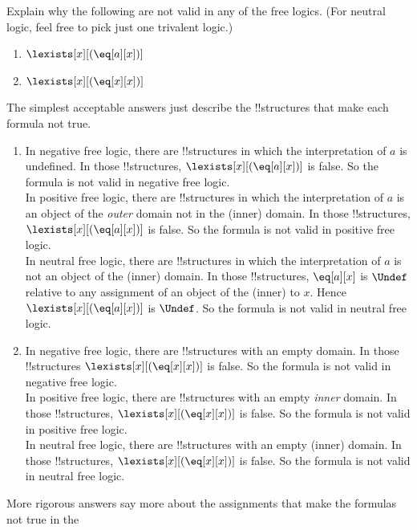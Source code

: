 \documentclass[../../../../include/open-logic-section]{subfiles}
\begin{document}


\begin{prob}[Semantics]
Explain why the following are not valid in any of the free logics.
(For neutral logic, feel free to pick just one trivalent logic.)
\begin{enumerate}
\item $\lexists[x][(\eq[a][x])]$
\item $\lexists[x][(\eq[x][x])]$
\end{enumerate}
\begin{ans}
The simplest acceptable answers just describe the !!{structure}s that make each formula not true. 
\begin{enumerate}
\item In negative free logic, there are !!{structure}s in which the interpretation of $a$ is
	undefined. In those !!{structure}s, $\lexists[x][(\eq[a][x])]$ is false. So the formula is not
	valid in negative free logic.\\
	In positive free logic, there are !!{structure}s in which the interpretation of $a$ is
	an object of the \emph{outer} domain not in the (inner) domain. In those !!{structure}s, 
	$\lexists[x][(\eq[a][x])]$ is false. So the formula is not valid in positive free logic.\\
	In neutral free logic, there are !!{structure}s in which the interpretation of $a$ is not 
	an object of the (inner) domain. In those !!{structure}s, $\eq[a][x]$ is $\Undef$ relative
	to any assignment of an object of the (inner) to $x$. Hence $\lexists[x][(\eq[a][x])]$ is 
	$\Undef$. So the formula is not valid in neutral free logic.
\item In negative free logic, there are !!{structure}s with an empty domain. In those 
	!!{structure}s $\lexists[x][(\eq[x][x])]$ is false. So the formula is not
	valid in negative free logic. \\
	In positive free logic, there are !!{structure}s with an empty \emph{inner} domain. In
	those !!{structure}s, $\lexists[x][(\eq[x][x])]$ is false. So the formula is not
	valid in positive free logic. \\
	In neutral free logic, there are !!{structure}s with an empty (inner) domain. In 
	those !!{structure}s, $\lexists[x][(\eq[x][x])]$ is false. So the formula is not
	valid in neutral free logic.
\end{enumerate}
More rigorous answers say more about the assignments that make the formulas not true in the 

\end{ans}
\end{prob}
\end{document}

